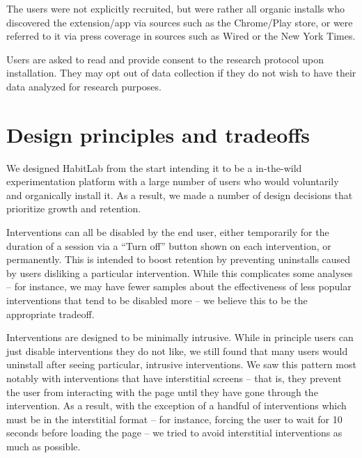 The users were not explicitly recruited, but were rather all organic installs who discovered the extension/app via sources such as the Chrome/Play store, or were referred to it via press coverage in sources such as Wired or the New York Times.


Users are asked to read and provide consent to the research protocol upon installation. They may opt out of data collection if they do not wish to have their data analyzed for research purposes.

\section{Design principles and tradeoffs}

We designed HabitLab from the start intending it to be a in-the-wild experimentation platform with a large number of users who would voluntarily and organically install it. As a result, we made a number of design decisions that prioritize growth and retention.

Interventions can all be disabled by the end user, either temporarily for the duration of a session via a ``Turn off'' button shown on each intervention, or permanently. This is intended to boost retention by preventing uninstalls caused by users disliking a particular intervention. While this complicates some analyses -- for instance, we may have fewer samples about the effectiveness of less popular interventions that tend to be disabled more -- we believe this to be the appropriate tradeoff.

Interventions are designed to be minimally intrusive. While in principle users can just disable interventions they do not like, we still found that many users would uninstall after seeing particular, intrusive interventions. We saw this pattern most notably with interventions that have interstitial screens -- that is, they prevent the user from interacting with the page until they have gone through the intervention. As a result, with the exception of a handful of interventions which must be in the interstitial format -- for instance, forcing the user to wait for 10 seconds before loading the page -- we tried to avoid interstitial interventions as much as possible.

